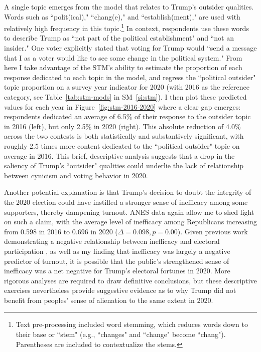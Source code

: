 \documentclass[12pt]{article}
\begin{document}
A single topic emerges from the model that relates to Trump's outsider qualities. Words such as ``polit(ical)," ``chang(e)," and ``establish(ment)," are used with relatively high frequency in this topic.\footnote{Text pre-processing included word stemming, which reduces words down to their base or ``stem" (e.g., ``changes" and ``change" become ``chang"). Parentheses are included to contextualize the stems.} In context, respondents use these words to describe Trump as ``not part of the political establishment" and ``not an insider." One voter explicitly stated that voting for Trump would ``send a message that I as a voter would like to see some change in the political system." From here I take advantage of the STM's ability to estimate the proportion of each response dedicated to each topic in the model, and regress the ``political outsider" topic proportion on a survey year indicator for 2020 (with 2016 as the reference category, see Table~\ref{tab:stm-mods} in SM~\ref{si:stm}). I then plot these predicted values for each year in Figure~\ref{fig:stm-2016-2020} where a clear gap emerges: respondents dedicated an average of 6.5\% of their response to the outsider topic in 2016 (left), but only 2.5\% in 2020 (right). This absolute reduction of 4.0\% across the two contests is both statistically and substantively significant, with roughly 2.5 times more content dedicated to the ``political outsider" topic on average in 2016. This brief, descriptive analysis suggests that a drop in the saliency of Trump's ``outsider" qualities could underlie the lack of relationship between cynicism and voting behavior in 2020.

Another potential explanation is that Trump's decision to doubt the integrity of the 2020 election could have instilled a stronger sense of inefficacy among some supporters, thereby dampening turnout. ANES data again allow me to shed light on such a claim, with the average level of inefficacy among Republicans increasing from 0.598 in 2016 to 0.696 in 2020 ($\Delta = 0.098, p = 0.00$). Given previous work demonstrating a negative relationship between inefficacy and electoral participation \parencite{aberbach1969alienation,southwell1998electoral}, as well as my finding that inefficacy was largely a negative predictor of turnout, it is possible that the public's strengthened sense of inefficacy was a net negative for Trump's electoral fortunes in 2020. More rigorous analyses are required to draw definitive conclusions, but these descriptive exercises nevertheless provide suggestive evidence as to why Trump did not benefit from peoples' sense of alienation to the same extent in 2020.
\end{document}
